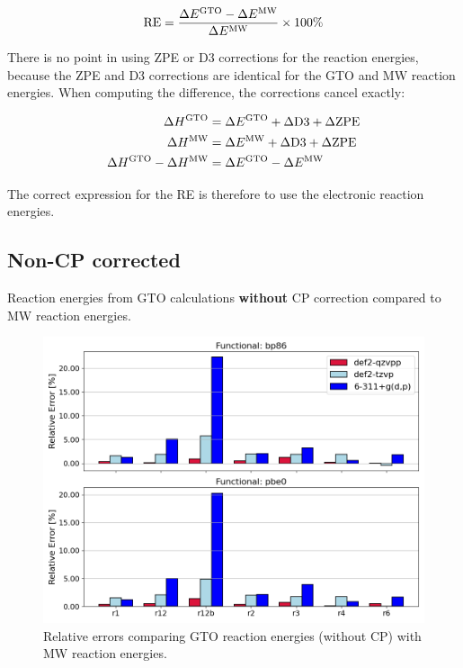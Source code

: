 \documentclass[11pt,a4paper]{article}
\begin{document}
\begin{equation} \label{eq: relative error}
\text{RE} = \frac{\Delta E^{\small\text{GTO}} - \Delta E^{\small\text{MW}}}{\Delta E^{\small\text{MW}}} \times 100\%
\end{equation}

There is no point in using ZPE or D3 corrections for the reaction energies, because the ZPE and D3 corrections are identical for the GTO and MW reaction energies.
When computing the difference, the corrections cancel exactly:

\begin{align} \label{eq: }
 \Delta H^{\small\text{GTO}} &= \Delta E^{\small\text{GTO}} + \Delta \text{D3} + \Delta \text{ZPE} \\
  \Delta H^{\small\text{MW}} &= \Delta E^{\small\text{MW}} + \Delta \text{D3} + \Delta \text{ZPE} \\
  \Delta H^{\small\text{GTO}} - \Delta H^{\small\text{MW}} &= \Delta E^{\small\text{GTO}} - \Delta E^{\small\text{MW}}
\end{align}

The correct expression for the RE is therefore to use the electronic reaction energies.

	\subsection{Non-CP corrected}
	Reaction energies from GTO calculations \textbf{without} CP correction compared to MW reaction energies.
	\begin{figure}[H]
		\centering
		\includegraphics[width = \textwidth]{../figs/old_gto_vs_mw_noncp.png}
		\caption{Relative errors comparing GTO reaction energies (without CP) with MW reaction energies.}
		\label{fig: }
	\end{figure}
\end{document}
